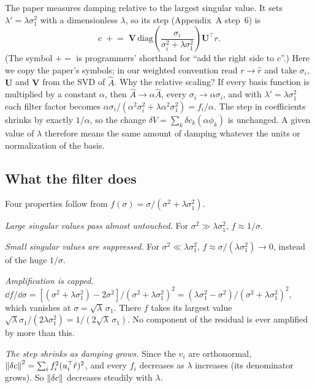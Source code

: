 The paper measures damping relative to the largest singular value. It sets $\lambda'=\lambda\sigma_1^2$ with a dimensionless $\lambda$, so its step (Appendix~A step~6) is
\begin{equation}
c\;\mathrel{+}=\;\bm V\,\mathrm{diag}\!\left(\frac{\sigma_i}{\sigma_i^2+\lambda\sigma_1^2}\right)\bm U^\top r .
\label{eq:fitting-paperstep}
\end{equation}
(The symbol $\mathrel{+}=$ is programmers' shorthand for ``add the right side to $c$''.) Here we copy the paper's symbols; in our weighted convention read $r\to\hat r$ and take $\sigma_i$, $\bm U$ and $\bm V$ from the SVD of $\hat A$. Why the relative scaling? If every basis function is multiplied by a constant $\alpha$, then $\hat A\to\alpha\hat A$, every $\sigma_i\to\alpha\sigma_i$, and with $\lambda'=\lambda\sigma_1^2$ each filter factor becomes $\alpha\sigma_i/(\alpha^2\sigma_i^2+\lambda\alpha^2\sigma_1^2)=f_i/\alpha$. The step in coefficients shrinks by exactly $1/\alpha$, so the change $\delta V=\sum_k\delta c_k(\alpha\phi_k)$ is unchanged. A given value of $\lambda$ therefore means the same amount of damping whatever the units or normalization of the basis.

\subsection{What the filter does}

Four properties follow from $f(\sigma)=\sigma/(\sigma^2+\lambda\sigma_1^2)$.

\emph{Large singular values pass almost untouched.} For $\sigma^2\gg\lambda\sigma_1^2$, $f\approx1/\sigma$.

\emph{Small singular values are suppressed.} For $\sigma^2\ll\lambda\sigma_1^2$, $f\approx\sigma/(\lambda\sigma_1^2)\to0$, instead of the huge $1/\sigma$.

\emph{Amplification is capped.} $\dd f/\dd\sigma=[(\sigma^2+\lambda\sigma_1^2)-2\sigma^2]/(\sigma^2+\lambda\sigma_1^2)^2=(\lambda\sigma_1^2-\sigma^2)/(\sigma^2+\lambda\sigma_1^2)^2$, which vanishes at $\sigma=\sqrt\lambda\,\sigma_1$. There $f$ takes its largest value $\sqrt\lambda\sigma_1/(2\lambda\sigma_1^2)=1/(2\sqrt\lambda\,\sigma_1)$. No component of the residual is ever amplified by more than this.

\emph{The step shrinks as damping grows.} Since the $v_i$ are orthonormal, $\left\lVert \delta c\right\rVert^2=\sum_if_i^2(u_i^\top\hat r)^2$, and every $f_i$ decreases as $\lambda$ increases (its denominator grows). So $\left\lVert \delta c\right\rVert$ decreases steadily with $\lambda$.

